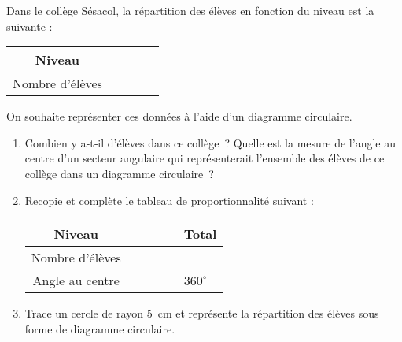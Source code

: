 \begin{exercice}
Dans le collège Sésacol, la répartition des élèves en fonction du niveau est la suivante :
\begin{center}
 \begin{tabularx}{\linewidth}{|c|*{4}{>{\centering\arraybackslash}X|}}
  \hline
  \rowcolor{U2} Niveau & 5\up{ème} & 6\up{ème} & 7\up{ème} & 8\up{ème} \\\hline
  \rowcolor{C3} Nombre d'élèves & 126 & 112 & 120 & 122 \\\hline
  \end{tabularx}
 \end{center}
On souhaite représenter ces données à l'aide d'un diagramme circulaire.
\begin{enumerate}
 \item Combien y a‑t‑il d'élèves dans ce collège ? Quelle est la mesure de l'angle au centre d'un secteur angulaire qui représenterait l'ensemble des élèves de ce collège dans un diagramme circulaire ?
 \item Recopie et complète le tableau de proportionnalité suivant :
\vspace{0.3cm}
\begin{center}
 \begin{tabularx}{\linewidth}{|c|*{5}{>{\centering\arraybackslash}X|}}
  \hline
  \rowcolor{U2} Niveau & 6\up{ème} & 5\up{ème} & 4\up{ème} & 3\up{ème} & Total \\\hline
  \rowcolor{C3} Nombre d'élèves & 126 & 112 & 120 & 122 & \\\hline
  \rowcolor{F3} Angle au centre & & & & & $360^\circ$ \\\hline
  \end{tabularx}
 \end{center}
 \vspace{0.3cm}
 \item Trace un cercle de rayon 5 cm et représente la répartition des élèves sous forme de diagramme circulaire.
 \end{enumerate}
\end{exercice}

